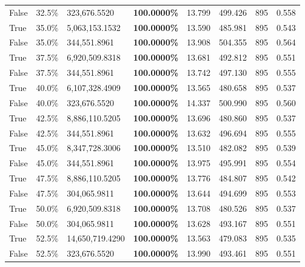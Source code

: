 \begin{table}[H]
\begin{tabular}{lllrllll}
\cline{1-8}
False & 32.5\% & 323,676.5520 & \bfseries \color{red} 100.0000\% & 13.799 & 499.426 & 895 & 0.558 \\
\cline{1-8}
True & 35.0\% & 5,063,153.1532 & \bfseries \color{red} 100.0000\% & 13.590 & 485.981 & 895 & 0.543 \\
\cline{1-8}
False & 35.0\% & 344,551.8961 & \bfseries \color{red} 100.0000\% & 13.908 & 504.355 & 895 & 0.564 \\
\cline{1-8}
True & 37.5\% & 6,920,509.8318 & \bfseries \color{red} 100.0000\% & 13.681 & 492.812 & 895 & 0.551 \\
\cline{1-8}
False & 37.5\% & 344,551.8961 & \bfseries \color{red} 100.0000\% & 13.742 & 497.130 & 895 & 0.555 \\
\cline{1-8}
True & 40.0\% & 6,107,328.4909 & \bfseries \color{red} 100.0000\% & 13.565 & 480.658 & 895 & 0.537 \\
\cline{1-8}
False & 40.0\% & 323,676.5520 & \bfseries \color{red} 100.0000\% & 14.337 & 500.990 & 895 & 0.560 \\
\cline{1-8}
True & 42.5\% & 8,886,110.5205 & \bfseries \color{red} 100.0000\% & 13.696 & 480.860 & 895 & 0.537 \\
\cline{1-8}
False & 42.5\% & 344,551.8961 & \bfseries \color{red} 100.0000\% & 13.632 & 496.694 & 895 & 0.555 \\
\cline{1-8}
True & 45.0\% & 8,347,728.3006 & \bfseries \color{red} 100.0000\% & 13.510 & 482.082 & 895 & 0.539 \\
\cline{1-8}
False & 45.0\% & 344,551.8961 & \bfseries \color{red} 100.0000\% & 13.975 & 495.991 & 895 & 0.554 \\
\cline{1-8}
True & 47.5\% & 8,886,110.5205 & \bfseries \color{red} 100.0000\% & 13.776 & 484.807 & 895 & 0.542 \\
\cline{1-8}
False & 47.5\% & \color{red} 304,065.9811 & \bfseries \color{red} 100.0000\% & 13.644 & 494.699 & 895 & 0.553 \\
\cline{1-8}
True & 50.0\% & 6,920,509.8318 & \bfseries \color{red} 100.0000\% & 13.708 & 480.526 & 895 & 0.537 \\
\cline{1-8}
False & 50.0\% & \color{red} 304,065.9811 & \bfseries \color{red} 100.0000\% & 13.628 & 493.167 & 895 & 0.551 \\
\cline{1-8}
True & 52.5\% & 14,650,719.4290 & \bfseries \color{red} 100.0000\% & 13.563 & 479.083 & 895 & 0.535 \\
\cline{1-8}
False & 52.5\% & 323,676.5520 & \bfseries \color{red} 100.0000\% & 13.990 & 493.461 & 895 & 0.551 \\

\end{tabular}
\end{table}
